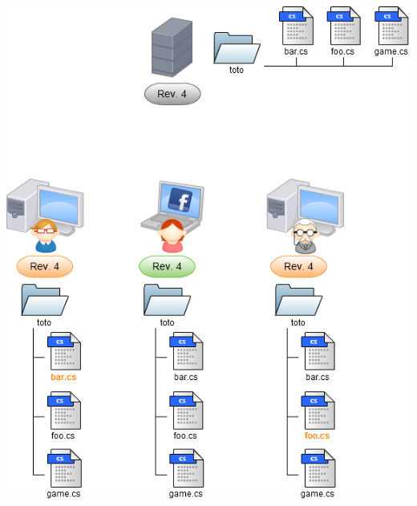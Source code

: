 \begin{frame}
  \begin{center}
    \includegraphics[scale=0.3]{images/3-Work.png}
  \end{center}
\end{frame}

